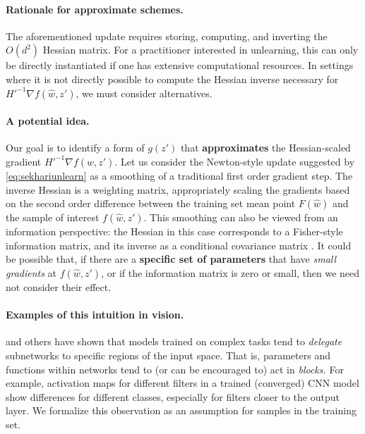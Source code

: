 \paragraph{Rationale for approximate schemes.}
The aforementioned update requires storing, computing, and inverting the $O(d^2)$ Hessian matrix.
For a practitioner interested in unlearning, this can only be directly instantiated if one has extensive computational resources.
In settings where it is not directly possible to compute the Hessian inverse necessary for $H'^{-1} \nabla f(\hat{w},z')$, we must consider alternatives. 

\paragraph{A potential idea.} Our goal is to identify a form of $g(z')$ that \textbf{approximates} the Hessian-scaled gradient $H'^{-1} \nabla f(\hat{w},z')$. 
Let us consider the Newton-style update suggested by 
\eqref{eq:sekhariunlearn}
as a smoothing of a traditional first order gradient step. 
The inverse Hessian is a weighting matrix,
appropriately scaling the gradients based on the second order difference between the training set mean point $F(\hat{w})$ and the sample of interest $f(\hat{w},z')$. 
This smoothing can also be viewed from an information perspective:
the Hessian in this case corresponds to a Fisher-style information matrix, and its inverse as a conditional covariance matrix \citep{Golatkar_2021_CVPR,golatkar2020forgetting}.
It could be possible that, if there are a \textbf{specific set of parameters} that have {\em small gradients} at $f(\hat{w},z')$, or if the information matrix is zero or small, then we need not consider their effect. 

\paragraph{Examples of this intuition in vision.} \cite{bau2017network,fong2018net2vec,Sun_2019_ICCV} and others have shown that models trained on complex tasks tend to \textit{delegate} subnetworks to specific regions of the input space. That is, parameters and functions within networks tend to (or can be encouraged to) act in \textit{blocks.}
For example, activation maps for different filters in a trained (converged) CNN model show differences for different classes, especially for filters closer to the output layer.
We formalize this observation as an assumption for samples in the training set.

